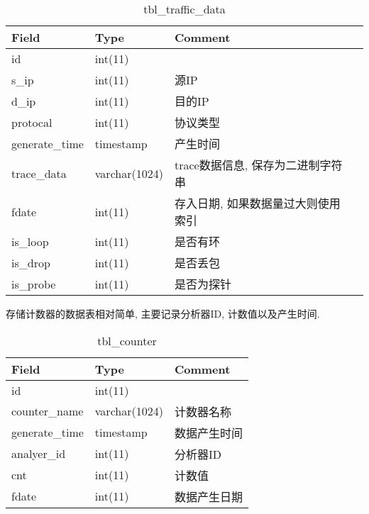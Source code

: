 \begin{table}[]
    \centering
    \caption{tbl\_traffic\_data}   %
    \begin{tabular}{llll}   \hline
    Field          & Type          & Comment                   \\ \hline
    id             & int(11)       &                           \\
    s\_ip          & int(11)       & 源IP                       \\
    d\_ip          & int(11)       & 目的IP                      \\
    protocal       & int(11)       & 协议类型                      \\
    generate\_time & timestamp     & 产生时间                      \\
    trace\_data    & varchar(1024) & trace数据信息, 保存为二进制字符串    \\
    fdate          & int(11)       & 存入日期, 如果数据量过大则使用索引 \\
    is\_loop       & int(11)       & 是否有环                      \\
    is\_drop       & int(11)       & 是否丢包                      \\
    is\_probe      & int(11)       & 是否为探针                    \\ \hline
    \end{tabular}
    \label{tbl_traffic_data}
\end{table}

存储计数器的数据表相对简单, 主要记录分析器ID, 计数值以及产生时间.

\begin{table}[]
    \centering
    \caption{tbl\_counter}
    \label{tbl_counter}
    \begin{tabular}{lll} \hline
    Field          & Type          & Comment \\ \hline
    id             & int(11)       &         \\
    counter\_name  & varchar(1024) & 计数器名称   \\
    generate\_time & timestamp     & 数据产生时间  \\
    analyer\_id    & int(11)       & 分析器ID   \\
    cnt            & int(11)       & 计数值     \\
    fdate          & int(11)       & 数据产生日期  \\ \hline
    \end{tabular}
\end{table}

